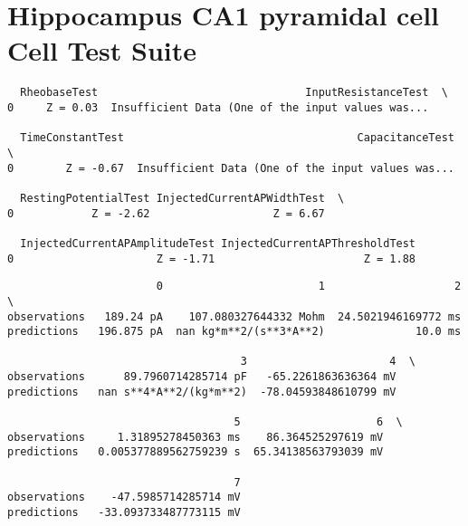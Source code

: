     
    \hypertarget{hippocampus-ca1-pyramidal-cell-cell-test-suite}{%
\section{Hippocampus CA1 pyramidal cell Cell Test
Suite}\label{hippocampus-ca1-pyramidal-cell-cell-test-suite}}

    
    
    \begin{verbatim}
  RheobaseTest                                InputResistanceTest  \
0     Z = 0.03  Insufficient Data (One of the input values was...   

  TimeConstantTest                                    CapacitanceTest  \
0        Z = -0.67  Insufficient Data (One of the input values was...   

  RestingPotentialTest InjectedCurrentAPWidthTest  \
0            Z = -2.62                   Z = 6.67   

  InjectedCurrentAPAmplitudeTest InjectedCurrentAPThresholdTest  
0                      Z = -1.71                       Z = 1.88  
    \end{verbatim}
    
    \begin{verbatim}
                       0                        1                    2  \
observations   189.24 pA    107.080327644332 Mohm  24.5021946169772 ms   
predictions   196.875 pA  nan kg*m**2/(s**3*A**2)              10.0 ms   

                                    3                      4  \
observations      89.7960714285714 pF   -65.2261863636364 mV   
predictions   nan s**4*A**2/(kg*m**2)  -78.04593848610799 mV   

                                   5                     6  \
observations     1.31895278450363 ms    86.364525297619 mV   
predictions   0.005377889562759239 s  65.34138563793039 mV   

                                   7  
observations    -47.5985714285714 mV  
predictions   -33.093733487773115 mV  
    \end{verbatim}



